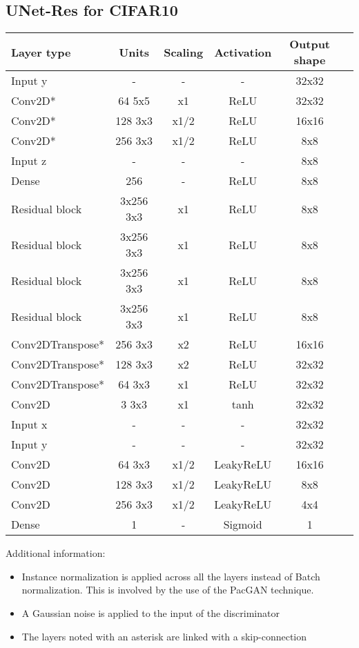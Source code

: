 \subsection{UNet-Res for CIFAR10} \label{subsec:Unet-Cifar}
\begin{table*}[!h]
	\centering
	\begin{tabular}{|l|c|c|c|c|c|}
		\hline
		Layer type & Units & Scaling & Activation & Output shape\\
		\hline
		Input y & - & - & - & 32x32\\
		Conv2D* & 64 5x5 & x1 & ReLU & 32x32 \\
		Conv2D* & 128 3x3 & x1/2 & ReLU & 16x16 \\
		Conv2D* & 256 3x3 & x1/2 & ReLU & 8x8 \\
		Input z & - & - & - & 8x8\\
		Dense & 256 & - & ReLU & 8x8\\
		Residual block & 3x256 3x3 & x1 & ReLU & 8x8 \\
		Residual block & 3x256 3x3 & x1 & ReLU & 8x8 \\
		Residual block & 3x256 3x3 & x1 & ReLU & 8x8 \\
		Residual block & 3x256 3x3 & x1 & ReLU & 8x8 \\
		Conv2DTranspose* & 256 3x3 & x2 & ReLU & 16x16 \\
		Conv2DTranspose* & 128 3x3 & x2 & ReLU & 32x32 \\
		Conv2DTranspose* & 64 3x3 & x1 & ReLU & 32x32 \\
		Conv2D & 3 3x3 & x1 & tanh & 32x32 \\
		\hline
		Input x & - & - & - & 32x32\\
		Input y & - & - & - & 32x32\\
		Conv2D & 64 3x3 & x1/2 & LeakyReLU & 16x16 \\
		Conv2D & 128 3x3 & x1/2 & LeakyReLU & 8x8 \\
		Conv2D & 256 3x3 & x1/2 & LeakyReLU & 4x4 \\
		Dense & 1 & - & Sigmoid & 1\\
		\hline
	\end{tabular}
\end{table*}

Additional information: \begin{itemize}
	\item Instance normalization \citep{Ulyanov2016} is applied across all the layers instead of Batch normalization. This is involved by the use of the PacGAN technique.
	\item A Gaussian noise is applied to the input of the discriminator
	\item The layers noted with an asterisk are linked with a skip-connection
\end{itemize}


